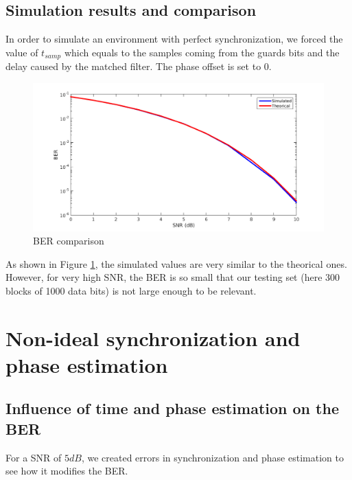 \documentclass[a4paper,12pt]{article}
\begin{document}
\subsection{Simulation results and comparison}
In order to simulate an environment with perfect synchronization, we forced the value of $t_{samp}$ which equals to the samples coming from the guards bits and the delay caused by the matched filter. The phase offset is set to $0$.
\begin{figure}[ht!]
\centering
\begin{center}
\includegraphics[scale=0.30]{BER_Exact-Sim.png}
\caption{BER comparison}
\label{BER}
\end{center}
\end{figure}
As shown in Figure \ref{BER}, the simulated values are very similar to the theorical ones. However, for very high SNR, the BER is so small that our testing set (here 300 blocks of 1000 data bits) is not large enough to be relevant.

\newpage
\section{Non-ideal synchronization and phase estimation}
\subsection{Influence of time and phase estimation on the BER}
For a SNR of $5dB$, we created errors in synchronization and phase estimation to see how it modifies the BER.
\end{document}
